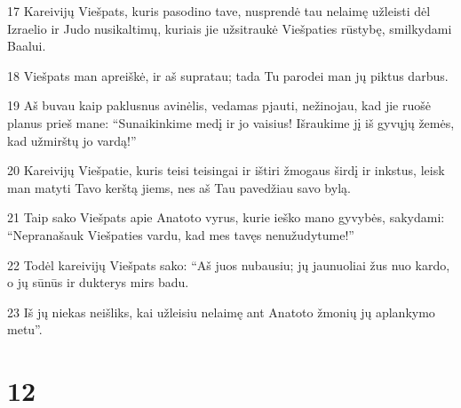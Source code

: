 \par 17 Kareivijų Viešpats, kuris pasodino tave, nusprendė tau nelaimę užleisti dėl Izraelio ir Judo nusikaltimų, kuriais jie užsitraukė Viešpaties rūstybę, smilkydami Baalui. 
\par 18 Viešpats man apreiškė, ir aš supratau; tada Tu parodei man jų piktus darbus. 
\par 19 Aš buvau kaip paklusnus avinėlis, vedamas pjauti, nežinojau, kad jie ruošė planus prieš mane: “Sunaikinkime medį ir jo vaisius! Išraukime jį iš gyvųjų žemės, kad užmirštų jo vardą!” 
\par 20 Kareivijų Viešpatie, kuris teisi teisingai ir ištiri žmogaus širdį ir inkstus, leisk man matyti Tavo kerštą jiems, nes aš Tau pavedžiau savo bylą. 
\par 21 Taip sako Viešpats apie Anatoto vyrus, kurie ieško mano gyvybės, sakydami: “Nepranašauk Viešpaties vardu, kad mes tavęs nenužudytume!” 
\par 22 Todėl kareivijų Viešpats sako: “Aš juos nubausiu; jų jaunuoliai žus nuo kardo, o jų sūnūs ir dukterys mirs badu. 
\par 23 Iš jų niekas neišliks, kai užleisiu nelaimę ant Anatoto žmonių jų aplankymo metu”.



\chapter{12}


